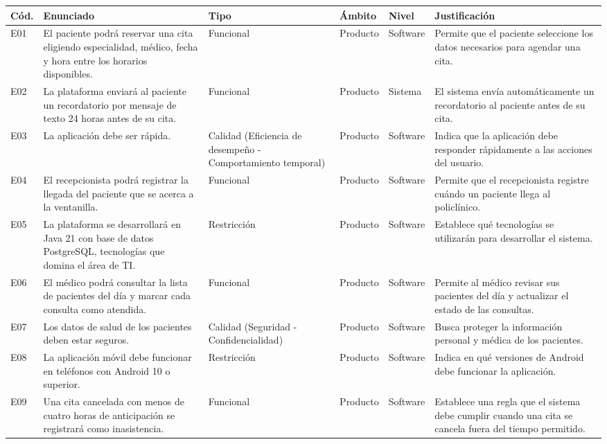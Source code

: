 \documentclass[11pt,a4paper]{article}
\begin{document}
{\small
\begin{longtable}{|>{\raggedright\arraybackslash}p{0.7cm}|>{\raggedright\arraybackslash}p{3.9cm}|>{\raggedright\arraybackslash}p{2.6cm}|>{\raggedright\arraybackslash}p{1.4cm}|>{\raggedright\arraybackslash}p{1.4cm}|>{\raggedright\arraybackslash}p{4.3cm}|}
\hline
\textbf{Cód.} & \textbf{Enunciado} & \textbf{Tipo} & \textbf{Ámbito} & \textbf{Nivel} & \textbf{Justificación} \\ \hline
\endhead
E01 & El paciente podrá reservar una cita eligiendo especialidad, médico, fecha y hora entre los horarios disponibles. & Funcional & Producto & Software & Permite que el paciente seleccione los datos necesarios para agendar una cita. \\ \hline
E02 & La plataforma enviará al paciente un recordatorio por mensaje de texto 24 horas antes de su cita. & Funcional & Producto & Sistema& El sistema envía automáticamente un recordatorio al paciente antes de su cita. \\ \hline
E03 & La aplicación debe ser rápida. & Calidad (Eficiencia de desempeño - Comportamiento temporal)& Producto & Software & Indica que la aplicación debe responder rápidamente a las acciones del usuario. \\ \hline
E04 & El recepcionista podrá registrar la llegada del paciente que se acerca a la ventanilla. & Funcional & Producto & Software & Permite que el recepcionista registre cuándo un paciente llega al policlínico. \\ \hline
E05 & La plataforma se desarrollará en Java 21 con base de datos PostgreSQL, tecnologías que domina el área de TI. & Restricción & Producto & Software & Establece qué tecnologías se utilizarán para desarrollar el sistema. \\ \hline
E06 & El médico podrá consultar la lista de pacientes del día y marcar cada consulta como atendida. & Funcional & Producto & Software & Permite al médico revisar sus pacientes del día y actualizar el estado de las consultas. \\ \hline
E07 & Los datos de salud de los pacientes deben estar seguros. & Calidad (Seguridad - Confidencialidad)& Producto & Software & Busca proteger la información personal y médica de los pacientes. \\ \hline
E08 & La aplicación móvil debe funcionar en teléfonos con Android 10 o superior. & Restricción & Producto & Software & Indica en qué versiones de Android debe funcionar la aplicación. \\ \hline
E09 & Una cita cancelada con menos de cuatro horas de anticipación se registrará como inasistencia. & Funcional & Producto & Software & Establece una regla que el sistema debe cumplir cuando una cita se cancela fuera del tiempo permitido. \\ \hline

\end{longtable}}
\end{document}
